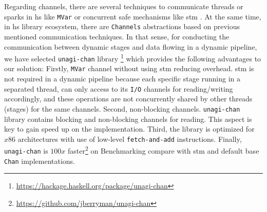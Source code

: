 Regarding channels, there are several techniques to communicate threads or sparks in \acrshort{hs} like \texttt{MVar} or concurrent safe mechanisms like \acrfull{stm} \cite{stm}. 
At the same time, in \acrshort{hs} library ecosystem, there are  \texttt{Channels} abstractions based on previous  mentioned communication techniques. 
In that sense, for conducting the co\-mmu\-ni\-ca\-tion between dynamic stages and data flowing in a dynamic pipeline, we have selected \texttt{unagi-chan} library \footnote{\url{https://hackage.haskell.org/package/unagi-chan}} which provides the following advantages to our solution: Firstly, \texttt{MVar} channel without using \acrshort{stm} reducing overhead. 
\acrshort{stm} is not required in a dynamic pipeline  because each specific stage running in a separated thread, can only access to its \texttt{I/O} channels for reading/writing accordingly, and these operations are not concurrently shared by other threads (stages) for the same channels. 
Second, non-blocking channels. \texttt{unagi-chan} library contains blocking and non-blocking channels for reading. This aspect is key to gain speed up on the implementation. Third, the library is optimized for $x86$ architectures with use of low-level \texttt{fetch-and-add} instructions. Finally, \texttt{unagi-chan} is $100x$ faster\footnote{\url{https://github.com/jberryman/unagi-chan}} on Benchmarking compare with \acrshort{stm} and default base \texttt{Chan} implementations.




